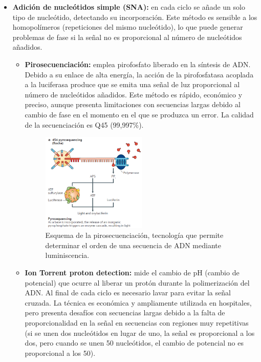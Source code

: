 \begin{itemize}
\begin{itemize}
\item \textbf{Adición de nucleótidos simple (SNA):} en cada ciclo se añade un solo tipo de nucleótido, detectando su incorporación. Este método es sensible a los homopolímeros (repeticiones del mismo nucleótido), lo que puede generar problemas de fase si la señal no es proporcional al número de nucleótidos añadidos.
\begin{itemize}
\item \textbf{Pirosecuenciación:} emplea pirofosfato liberado en la síntesis de ADN. Debido a su enlace de alta energía, la acción de la pirofosfatasa acoplada a la luciferasa produce que se emita una señal de luz proporcional al número de nucleótidos añadidos. Este método es rápido, económico y preciso, aunque presenta limitaciones con secuencias largas debido al cambio de fase en el momento en el que se produzca un error. La calidad de la secuenciación es Q45 (99,997\%). 

\begin{figure}[htbp]
\centering
\includegraphics[width = 0.5\textwidth]{figs/pirosecuenciacion.png}
\caption{Esquema de la pirosecuenciación, tecnología que permite determinar el orden de una secuencia de ADN mediante luminiscencia.}
\end{figure}

\item \textbf{Ion Torrent proton detection:} mide el cambio de pH (cambio de potencial) que ocurre al liberar un protón durante la polimerización del ADN. Al final de cada ciclo es necesario lavar para evitar la señal cruzada. La técnica es económica y ampliamente utilizada en hospitales, pero presenta desafíos con secuencias largas debido a la falta de proporcionalidad en la señal en secuencias con regiones muy repetitivas (si se unen dos nucleótidos en lugar de uno, la señal es proporcional a los dos, pero cuando se unen 50 nucleótidos, el cambio de potencial no es proporcional a los 50).


\end{itemize}
\end{itemize}
\end{itemize}
